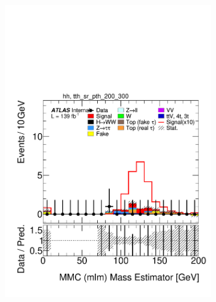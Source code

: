 \begin{figure}[h]
\begin{subfigure}[b]{0.32\textwidth}
    \includegraphics[width=\textwidth]{images/sr_cr_plots/plot_ditau_mmc_mlm_m_hh_tth_sr_pth_200_300.pdf}
    \caption{}
  \end{subfigure}
  \begin{subfigure}[b]{0.32\textwidth}

\end{subfigure}
\end{figure}
